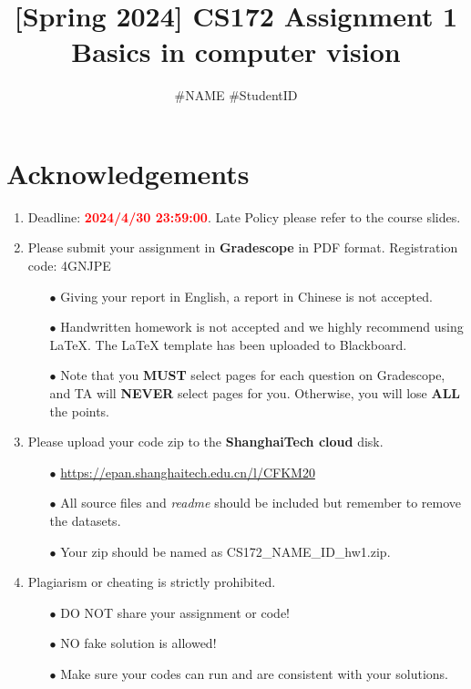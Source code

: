 \documentclass[]{article}
\title{\textbf{[Spring 2024] CS172 Assignment 1\\
Basics in computer vision}}
\author{\#NAME \#StudentID}
\begin{document}
\maketitle

\section*{Acknowledgements}
\begin{enumerate} 
    \item Deadline: \textcolor{red}{\textbf{2024/4/30 23:59:00}}. Late Policy please refer to the course slides.
    
    \item Please submit your assignment in \textbf{Gradescope} in PDF format.  Registration code: 4GNJPE
    \begin{itemize}
        \item[$\bullet$] Giving your report in English, a report in Chinese is not accepted.
        \item[$\bullet$] Handwritten homework is not accepted and we highly recommend using LaTeX. The LaTeX template has been uploaded to Blackboard.
        \item[$\bullet$] Note that you \textbf{MUST} select pages for each question on Gradescope, and TA will \textbf{NEVER} select pages for you. Otherwise, you will lose \textbf{ALL} the points.
    \end{itemize}

    
    \item Please upload your code zip to the \textbf{ShanghaiTech cloud} disk.
    \begin{itemize}
        \item[$\bullet$] \small{\url{https://epan.shanghaitech.edu.cn/l/CFKM20}}
        \item[$\bullet$] All source files and \textit{readme} should be included but remember to remove the datasets.
        \item[$\bullet$] Your zip should be named as CS172\_NAME\_ID\_hw1.zip.
    \end{itemize}
    
    
    \item Plagiarism or cheating is strictly prohibited. 
    \begin{itemize}
        \item[$\bullet$] DO NOT share your assignment or code!
        \item[$\bullet$] NO fake solution is allowed!
        \item[$\bullet$] Make sure your codes can run and are consistent with your solutions.
    \end{itemize}
    
    
\end{enumerate}
\end{document}
